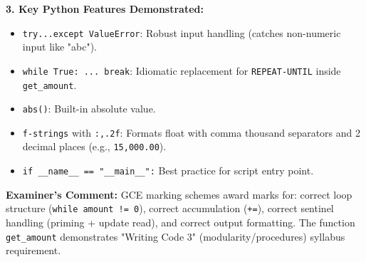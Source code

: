 \documentclass[11pt]{article}
\begin{document}
\begin{exoresolu}
\noindent\textbf{3. Key Python Features Demonstrated:}
\begin{itemize}
    \item \texttt{try...except ValueError}: Robust input handling (catches non-numeric input like "abc").
    \item \texttt{while True: ... break}: Idiomatic replacement for \texttt{REPEAT-UNTIL} inside \texttt{get\_amount}.
    \item \texttt{abs()}: Built-in absolute value.
    \item \texttt{f-strings} with \texttt{:,.2f}: Formats float with comma thousand separators and 2 decimal places (e.g., \texttt{15,000.00}).
    \item \texttt{if \_\_name\_\_ == "\_\_main\_\_":} Best practice for script entry point.
\end{itemize}

\noindent\textbf{Examiner's Comment:} GCE marking schemes award marks for: correct loop structure (\texttt{while amount != 0}), correct accumulation (\texttt{+=}), correct sentinel handling (priming + update read), and correct output formatting. The function \texttt{get\_amount} demonstrates "Writing Code 3" (modularity/procedures) syllabus requirement.
\end{exoresolu}
\end{document}
